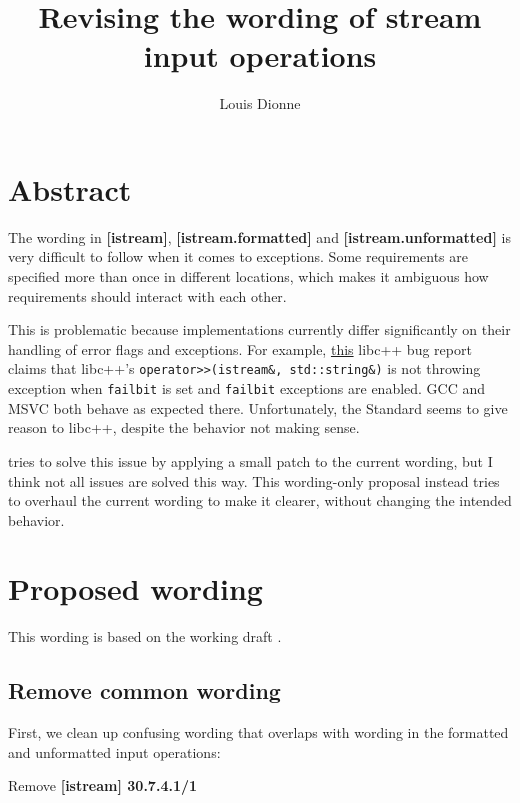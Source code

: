 \documentclass{wg21}
\title{Revising the wording of stream input operations}
\author{Louis Dionne}{ldionne@apple.com}
\newcommand{\cc}[1]{\texttt{#1}}
\begin{document}
\maketitle

\section{Abstract}
The wording in \textbf{[istream]}, \textbf{[istream.formatted]} and
\textbf{[istream.unformatted]} is very difficult to follow when it comes
to exceptions. Some requirements are specified more than once in different
locations, which makes it ambiguous how requirements should interact with
each other.

This is problematic because implementations currently differ significantly
on their handling of error flags and exceptions. For example,
\href{https://bugs.llvm.org/show_bug.cgi?id=21586}{this} libc++ bug
report claims that libc++'s \break \cc{operator>>(istream&, std::string&)} is
not throwing exception when \cc{failbit} is set and \cc{failbit} exceptions
are enabled. GCC and MSVC both behave as expected there. Unfortunately, the
Standard seems to give reason to libc++, despite the behavior not making sense.

\cite{LWG2349} tries to solve this issue by applying a small patch to the current
wording, but I think not all issues are solved this way. This wording-only
proposal instead tries to overhaul the current wording to make it clearer,
without changing the intended behavior.


\section{Proposed wording}
This wording is based on the working draft \cite{N4727}.

\subsection{Remove common wording}
First, we clean up confusing wording that overlaps with wording in the formatted
and unformatted input operations:

Remove \textbf{[istream] 30.7.4.1/1}
\begin{quote}
\end{quote}
\end{document}
